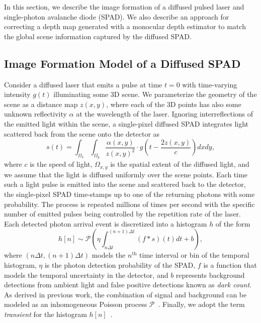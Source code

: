 In this section, we describe the image formation of a diffused pulsed laser and single-photon avalanche diode (SPAD). We also describe an approach for correcting a depth map generated with a monocular depth estimator to match the global scene information captured by the diffused SPAD.


\subsection{Image Formation Model of a Diffused SPAD}

Consider a diffused laser that emits a pulse at time $t = 0$ with time-varying
intensity $g(t)$ illuminating some 3D scene. We parameterize the geometry of the
scene as a distance map $z(x, y)$, where each of the 3D points has also some
unknown reflectivity $\alpha$ at the wavelength of the laser. Ignoring
interreflections of the emitted light within the scene, a single-pixel diffused
SPAD integrates light scattered back from the scene onto the detector as
%
\begin{equation}
	s \left( t \right)= \int_{\Omega_x} \int_{\Omega_y} \frac{\alpha \left( x,y \right)}{z(x,y)^2} \cdot  g \left( t - \frac{2z(x,y)}{c} \right) dx dy ,
	\label{eq:pulse_integral} 
\end{equation}  
%
where $c$ is the speed of light, $\Omega_{x,y}$ is the spatial extent of the
diffused light, and we assume that the light is diffused uniformly over the
scene points. Each time such a light pulse is emitted into the scene and
scattered back to the detector, the single-pixel SPAD time-stamps up to one of
the returning photons with some probability. The process is repeated millions of
times per second with the specific number of emitted pulses being controlled by
the repetition rate of the laser.  Each detected photon arrival event is
discretized into a histogram $h$ of the form
%
\begin{equation}
  h[n] \sim \mathcal{P} \left( \eta \int_{n\Delta t}^{(n+1)\Delta t} \left(f * s \right) \left( t \right)  dt + b \right),	
	\label{eq:spad_measurements}
\end{equation}
%
where $(n\Delta t, (n+1) \Delta t)$ models the $n^\text{th}$ time interval or bin of the
temporal histogram, $\eta$ is the photon detection probability of the SPAD, $f$
is a function that models the temporal uncertainty in the detector, and $b$
represents background detections from ambient light and false positive detections known as \textit{dark
count}. As derived in previous work, the combination of signal and background
can be modeled as an inhomogeneous Poisson process
$\mathcal{P}$~\cite{Kirmani:2014,Shin2015}. Finally, we adopt the term
\textit{transient} for the histogram $h[n]$~\cite{Xin2019}.

